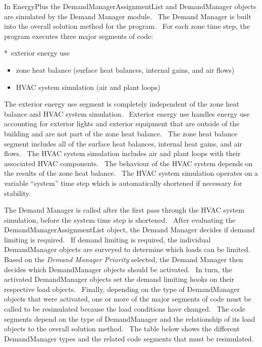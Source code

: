 In EnergyPlus the DemandManagerAssignmentList and DemandManager objects are simulated by the Demand Manager module.~ The Demand Manager is built into the overall solution method for the program.~ For each zone time step, the program executes three major segments of code:

*~exterior energy use

\begin{itemize}
\item
  zone heat balance (surface heat balances, internal gains, and air flows)
\item
  HVAC system simulation (air and plant loops)
\end{itemize}

The exterior energy use segment is completely independent of the zone heat balance and HVAC system simulation.~ Exterior energy use handles energy use accounting for exterior lights and exterior equipment that are outside of the building and are not part of the zone heat balance.~ The zone heat balance segment includes all of the surface heat balances, internal heat gains, and air flows.~ The HVAC system simulation includes air and plant loops with their associated HVAC components.~ The behaviour of the HVAC system depends on the results of the zone heat balance.~ The HVAC system simulation operates on a variable ``system'' time step which is automatically shortened if necessary for stability.

The Demand Manager is called after the first pass through the HVAC system simulation, before the system time step is shortened.~ After evaluating the DemandManagerAssignmentList object, the Demand Manager decides if demand limiting is required.~ If demand limiting is required, the individual DemandManager objects are surveyed to determine which loads can be limited.~ Based on the \emph{Demand Manager Priority} selected, the Demand Manager then decides which DemandManager objects should be activated.~ In turn, the activated DemandManager objects set the demand limiting hooks on their respective load objects.~ Finally, depending on the type of DemandManager objects that were activated, one or more of the major segments of code must be called to be resimulated because the load conditions have changed.~ The code segments depend on the type of DemandManager and the relationship of its load objects to the overall solution method.~ The table below shows the different DemandManager types and the related code segments that must be resimulated.

